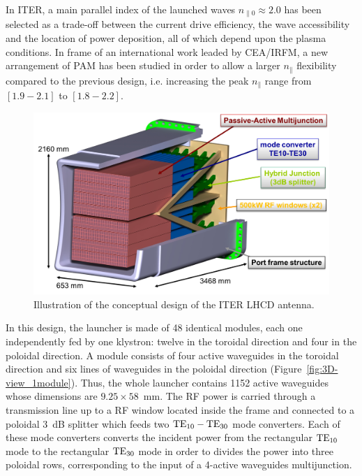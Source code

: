 In ITER, a main parallel index of the launched waves $n_{\parallel 0} \approx 2.0$ has been selected as a trade-off between the current drive efficiency, the wave accessibility and the location of power deposition, all of which depend upon the plasma conditions. In frame of an international work leaded by CEA/IRFM, a new arrangement of PAM has been studied in order to allow a larger $n_{\parallel}$ flexibility compared to the previous design\cite{bibet2005-1}, i.e. increasing the peak $n_{\parallel}$ range from $\left[1.9-2.1\right]$ to $\left[1.8-2.2\right]$. 

\begin{figure}
	\centering
	\includegraphics[width=1.0\linewidth]{figures/chap3/ITER_antenna/ITER_LH_antenna}
	\caption{Illustration of the conceptual design of the ITER LHCD antenna. }
	\label{fig:iterlhantenna}
\end{figure}

In this design, the launcher is made of 48 identical modules, each one independently fed by one klystron: twelve in the toroidal direction and four in the poloidal direction. A module consists of four active waveguides in the toroidal direction and six lines of waveguides in the poloidal direction (Figure~\ref{fig:3D-view_1module}). Thus, the whole launcher contains 1152 active waveguides whose dimensions are $9.25\times58$~mm. The RF power is carried through a transmission line up to a RF window
located inside the frame and connected to a poloidal 3~dB splitter which feeds two ${\mathrm{TE}}_{10}-{\mathrm{TE}}_{30}$ mode converters. Each of these mode converters converts the incident power from the rectangular ${\mathrm{TE}}_{10}$ mode to the rectangular ${\mathrm{TE}}_{30}$ mode in order to divides the power into three poloidal rows, corresponding to the input of a 4-active waveguides multijunction. 

